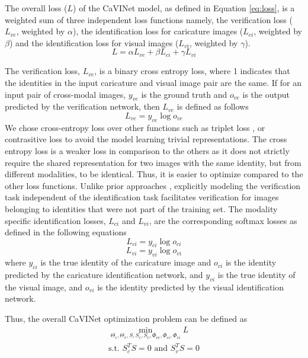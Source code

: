 The overall loss ($L$) of the CaVINet model, as defined in Equation \ref{eq:loss}, is a weighted sum of three independent loss functions namely, the verification loss ($L_{ve}$, weighted by $\alpha$), the identification loss for caricature images ($L_{ci}$, weighted by $\beta$) and the identification loss for visual images ($L_{vi}$, weighted by $\gamma$).
\begin{equation}
    L= \alpha L_{ve} + \beta L_{ci} + \gamma L_{vi}
    \label{eq:loss}
\end{equation}

The verification loss, $L_{ve}$, is a binary cross entropy loss, where 1 indicates that the identities in the input caricature and visual image pair are the same. If for an input pair of cross-modal images, $y_{ve}$ is the ground truth and $o_{ve}$ is the output predicted by the verification network, then $L_{ve}$ is defined as follows
\begin{equation}
    L_{ve} = y_{ve} \log o_{ve}
\end{equation}
We chose cross-entropy loss over other functions such as triplet loss \cite{Facenet}, or contrasitive loss \cite{contrastive} to avoid the model learning trivial representations. The cross entropy loss is a weaker loss in comparison to the others as it does not strictly require the shared representation for two images with the same identity, but from different modalities, to be identical. Thus, it is easier to optimize compared to the other loss functions. Unlike prior approaches \cite{AAAI_2017}, explicitly modeling the verification task independent of the identification task facilitates verification for images belonging to identities that were not part of the training set. The modality specific identification losses, $L_{ci}$ and $L_{vi}$, are the corresponding softmax losses as defined in the following equations
\begin{equation}
L_{ci}= y_{ci}\log o_{ci}     
\end{equation}
\begin{equation}
L_{vi} = y_{vi}\log o_{vi} 
\end{equation}
where $y_{ci}$ is the true identity of the caricature image and $o_{ci}$ is the identity predicted by the caricature identification network, and $y_{vi}$ is the true identity of the visual image, and $o_{vi}$ is the identity predicted by the visual identification network.

Thus, the overall CaVINet optimization problem can be defined as 
\begin{eqnarray*}
   \min_{\Theta_c,\Theta_v, S, S_c, S_v, \Phi_{ve}, \Phi_{ci}, \Phi_{vi}} L \\
   \mbox{s.t. } S_c^TS=0 \mbox{ and } S_v^TS=0
\end{eqnarray*}

